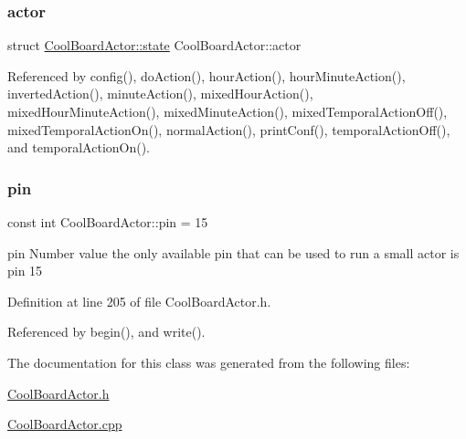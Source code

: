 \subsubsection{\texorpdfstring{actor}{actor}}
{\footnotesize\ttfamily struct \hyperlink{class_cool_board_actor_d5/ddc/struct_cool_board_actor_1_1state}{Cool\+Board\+Actor\+::state} Cool\+Board\+Actor\+::actor\hspace{0.3cm}{\ttfamily [private]}}



Referenced by config(), do\+Action(), hour\+Action(), hour\+Minute\+Action(), inverted\+Action(), minute\+Action(), mixed\+Hour\+Action(), mixed\+Hour\+Minute\+Action(), mixed\+Minute\+Action(), mixed\+Temporal\+Action\+Off(), mixed\+Temporal\+Action\+On(), normal\+Action(), print\+Conf(), temporal\+Action\+Off(), and temporal\+Action\+On().

\mbox{\label{class_cool_board_actor_a8b5c0b41fe6033b68d9e1ed00bc2e122}} 
\subsubsection{\texorpdfstring{pin}{pin}}
{\footnotesize\ttfamily const int Cool\+Board\+Actor\+::pin = 15\hspace{0.3cm}{\ttfamily [private]}}

pin Number value the only available pin that can be used to run a small actor is pin 15 

Definition at line 205 of file Cool\+Board\+Actor.\+h.



Referenced by begin(), and write().



The documentation for this class was generated from the following files\+:\begin{DoxyCompactItemize}
\item 
\hyperlink{_cool_board_actor_8h}{Cool\+Board\+Actor.\+h}\item 
\hyperlink{_cool_board_actor_8cpp}{Cool\+Board\+Actor.\+cpp}\end{DoxyCompactItemize}
